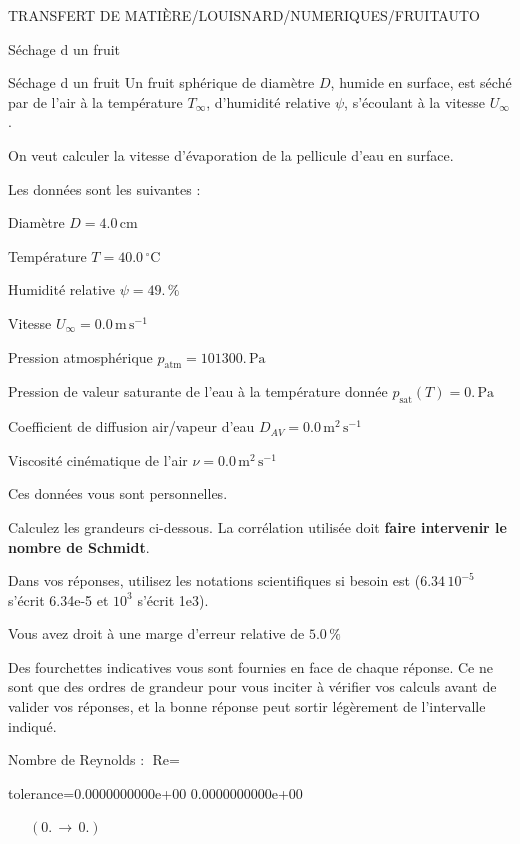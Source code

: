 \documentclass[12pt]{article}
\begin{document}
\begin{quiz}{TRANSFERT DE MATIÈRE/LOUISNARD/NUMERIQUES/FRUITAUTO}
\begin{cloze}{Séchage d un fruit}
\end{cloze} 


 \begin{cloze}{Séchage d un fruit} 
Un fruit sphérique de diamètre $D$, humide en surface, est séché par de l'air à la température $T_\infty$, d'humidité relative $\psi$, s'écoulant à la vitesse $U_\infty$.

On veut calculer la vitesse d'évaporation de la pellicule d'eau en surface.

 

Les données sont les suivantes :

 

Diamètre $D = 4.0\,  \mathrm{cm} $

Température $T = 40.0\,  \mathrm{^\circ\mathrm{C}} $

Humidité relative $\psi = 49.\, \% $

Vitesse $U_\infty = 0.0\,  \mathrm{m}\,  \mathrm{s}^{-1} $

Pression atmosphérique $p_{\text{atm}} = 101300.\,  \mathrm{Pa} $

Pression de valeur saturante de l’eau à la température donnée $p_{\text{sat}}(T) = 0.\,  \mathrm{Pa} $

Coefficient de diffusion air/vapeur d’eau $D_{AV} = 0.0\,  \mathrm{m}^{2}\,  \mathrm{s}^{-1} $

Viscosité cinématique de l’air $\nu = 0.0\,  \mathrm{m}^{2}\,  \mathrm{s}^{-1} $

Ces données vous sont personnelles.

 

Calculez les grandeurs ci-dessous. La corrélation utilisée doit \textbf{faire intervenir le nombre de Schmidt}.

Dans vos réponses, utilisez les notations scientifiques si besoin est ($6.34\, 10^{-5}$ s'écrit 6.34e-5 et $10^{3}$ s'écrit 1e3).

Vous avez droit à une marge d'erreur relative de $5.0\, \% $

Des fourchettes indicatives vous sont fournies en face de chaque réponse. Ce ne sont que des ordres de grandeur pour vous inciter à vérifier vos calculs avant de valider vos réponses, et la bonne réponse peut sortir légèrement de l'intervalle indiqué.

 

Nombre de Reynolds : $\text{Re} =  $
\begin{numerical}[points=1] 
\item[tolerance={0.0000000000e+00}] 0.0000000000e+00 
\end{numerical} 
 $\,$ 
 $ \quad (0. \, \rightarrow \, 0.) $ 


\end{cloze}
\end{quiz}
\end{document}
